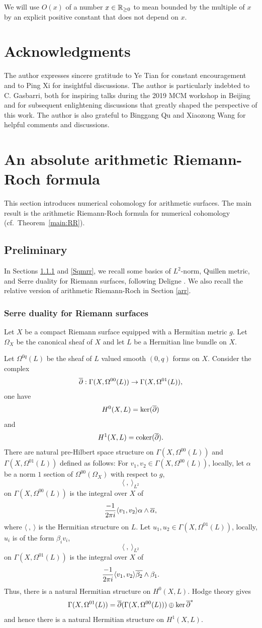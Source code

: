 \documentclass[]{amsart}
\newcommand{\coker}{{\mathrm{coker}}}\newcommand{\cyc}{{\mathrm{cyc}}}
\newcommand{\pair}[1]{\langle {#1} \rangle}
\newcommand{\ra}{\rightarrow} \newcommand{\imp}{\Longrightarrow}
\theoremstyle{plain}
\theoremstyle{remark} \newtheorem{remark}[thm]{Remark}
\theoremstyle{remark} \newtheorem{exercise}{Exercise}
\theoremstyle{remark} \newtheorem{example}{Example}
\numberwithin{equation}{section}
\begin{document}
We will use $O(x)$ of a number $x\in {\mathbb {R}}_{\geq 0}$ to mean bounded by the multiple of $x$ by an explicit positive constant that does not depend on $x$.
\section*{Acknowledgments} 


The author expresses sincere gratitude to Ye Tian for constant encouragement and to Ping Xi for insightful discussions. The author is particularly indebted to C. Gasbarri, both for inspiring talks during the 2019 MCM workshop in Beijing and for subsequent enlightening discussions that greatly shaped the perspective of this work. The author is also grateful to Binggang Qu and Xiaozong Wang for helpful comments and discussions.
\section{An absolute arithmetic Riemann-Roch formula} 
This section introduces numerical cohomology for arithmetic surfaces. The main result is the arithmetic Riemann-Roch formula for numerical cohomology (cf.~Theorem~\ref{main:RR}).
\subsection{Preliminary}\label{pre}In Sections \ref{ssd} and \ref{Sqmrr}, we recall some basics of $L^2$-norm, Quillen metric, and Serre duality for Riemann surfaces, following Deligne \cite[Sec.~1.2~$\&$~1.4]{Deligne:85}. We also recall the relative version of arithmetic Riemann-Roch in Section \ref{arr}.
\subsubsection{Serre duality for Riemann surfaces}
\label{ssd}
Let $X$ be a compact Riemann surface equipped with a Hermitian metric $g$. Let $\Omega_X$ be the canonical sheaf of $X$ and let $L$ be a Hermitian line bundle on $X$. 


Let $\Omega^{0q}(L)$ be the sheaf of $L$ valued smooth $(0,q)$ forms on $X$.
Consider the complex 
\[\ov{\partial}:\Gamma(X,\Omega^{00}(L))\ra \Gamma(X,\Omega^{01}(L)),\] one have 
\[H^0(X,L)=\ker(\overline{\partial})\] and \[H^1(X,L)=\coker(\ov{\partial}).\]
There are natural pre-Hilbert space structure on $\Gamma(X,\Omega^{00}(L))$ and $\Gamma(X,\Omega^{01}(L))$ defined as follows: 
For $v_1,v_2\in \Gamma(X,\Omega^{00}(L))$, locally, let $\alpha$ be a norm $1$ section of $\Omega^{00}(\Omega_{X})$ with respect to $g$,
\[\pair{\ ,\ }_{L^2}\] on $\Gamma(X,\Omega^{00}(L))$ is the integral over $X$ of 
\[\frac{-1}{2\pi i}\pair{v_1,v_2}\alpha\wedge\ov{\alpha},\]where $\pair{\ ,\ }$ is the Hermitian structure on $L$.
Let $u_1,u_2\in \Gamma(X,\Omega^{01}(L))$, locally, $u_i$ is of the form $\beta_iv_i$, 
\[\pair{\ ,\ }_{L^2}\]  on $\Gamma(X,\Omega^{01}(L))$ is the integral over $X$ of 
\[\frac{-1}{2\pi i}\pair{v_1,v_2}\ov{\beta_2}\wedge \beta_1.\]
Thus, there is a natural Hermitian structure on $H^0(X,L)$.
Hodge theory gives 
\[\Gamma(X,\Omega^{01}(L))=\overline{\partial}(\Gamma(X,\Omega^{00}(L)))\oplus \ker \overline{\partial}^*\] and hence there is a natural Hermitian structure on $H^1(X,L)$. 
\end{document}
